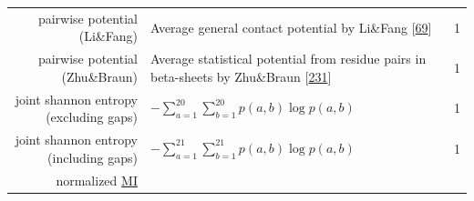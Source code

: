 \documentclass[11pt,a4paper,twoside]{book}
\theoremstyle{definition}
\theoremstyle{definition}
\theoremstyle{remark}
\begin{document}
\begin{longtable}[]{@{}rlc@{}}
\begin{minipage}[t]{0.23\columnwidth}\raggedleft\strut
pairwise potential (Li\&Fang)\strut
\end{minipage} & \begin{minipage}[t]{0.50\columnwidth}\raggedright\strut
Average general contact potential by Li\&Fang
{[}\protect\hyperlink{ref-Li2011}{69}{]}\strut
\end{minipage} & \begin{minipage}[t]{0.18\columnwidth}\centering\strut
1\strut
\end{minipage}\tabularnewline
\begin{minipage}[t]{0.23\columnwidth}\raggedleft\strut
pairwise potential (Zhu\&Braun)\strut
\end{minipage} & \begin{minipage}[t]{0.50\columnwidth}\raggedright\strut
Average statistical potential from residue pairs in beta-sheets by
Zhu\&Braun {[}\protect\hyperlink{ref-Zhu1999}{231}{]}\strut
\end{minipage} & \begin{minipage}[t]{0.18\columnwidth}\centering\strut
1\strut
\end{minipage}\tabularnewline
\begin{minipage}[t]{0.23\columnwidth}\raggedleft\strut
joint shannon entropy (excluding gaps)\strut
\end{minipage} & \begin{minipage}[t]{0.50\columnwidth}\raggedright\strut
\(- \sum_{a=1}^{20}\sum_{b=1}^{20} p(a,b) \log p(a,b)\)\strut
\end{minipage} & \begin{minipage}[t]{0.18\columnwidth}\centering\strut
1\strut
\end{minipage}\tabularnewline
\begin{minipage}[t]{0.23\columnwidth}\raggedleft\strut
joint shannon entropy (including gaps)\strut
\end{minipage} & \begin{minipage}[t]{0.50\columnwidth}\raggedright\strut
\(- \sum_{a=1}^{21}\sum_{b=1}^{21} p(a,b) \log p(a,b)\)\strut
\end{minipage} & \begin{minipage}[t]{0.18\columnwidth}\centering\strut
1\strut
\end{minipage}\tabularnewline
\begin{minipage}[t]{0.23\columnwidth}\raggedleft\strut
normalized \protect\hyperlink{abbrev}{MI}\strut
\end{minipage} & \begin{minipage}[t]{0.50\columnwidth}\raggedright\strut

\end{minipage}
\end{longtable}
\end{document}
